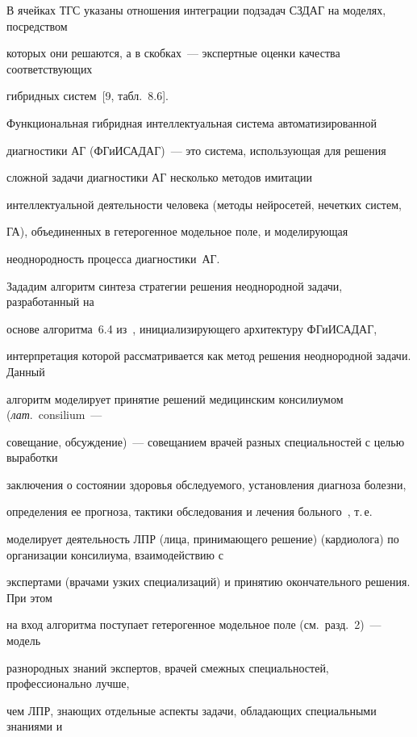  В ячейках ТГС указаны отношения интеграции подзадач СЗДАГ на моделях, посредством


которых они решаются, а в скобках~--- экспертные оценки качества соответствующих


гибридных систем~[9, табл.~8.6].





 Функциональная гибридная интеллектуальная система автоматизированной


диагностики АГ (ФГиИСАДАГ)~--- это система, использующая для решения


сложной задачи диагностики АГ несколько методов имитации


интеллектуальной деятельности человека (методы нейросетей, нечетких систем,


ГА), объединенных в гетерогенное модельное поле, и моделирующая


неоднородность процесса диагностики~АГ.





 Зададим алгоритм синтеза стратегии решения неоднородной задачи, разработанный на


основе алгоритма~6.4 из~\cite{2-kir}, инициализирующего архитектуру ФГиИСАДАГ,


интерпретация которой рассматривается как метод решения неоднородной задачи. Данный


алгоритм моделирует принятие решений медицинским консилиумом (\textit{лат}.\ consilium~---


совещание, обсуждение)~--- совещанием врачей разных специальностей с целью выработки


заключения о состоянии здоровья обследуемого, установления диагноза болезни,


определения ее прогноза, тактики обследования и лечения больного~\cite{14-kir}, т.\,е.\


моделирует деятельность ЛПР (лица, принимающего решение) (кардиолога) по организации консилиума, взаимодействию с


экспертами (врачами узких специализаций) и принятию окончательного решения. При этом


на вход алгоритма поступает гетерогенное модельное поле (см.\ разд.~2)~--- модель


разнородных знаний экспертов, врачей смежных специальностей, профессионально лучше,


чем ЛПР, знающих отдельные аспекты задачи, обладающих специальными знаниями и



